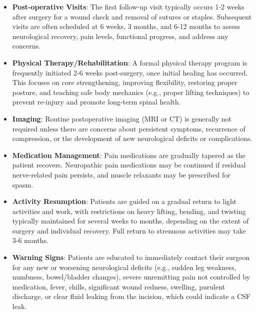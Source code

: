 \begin{itemize}
  \item \textbf{Post-operative Visits}: The first follow-up visit typically occurs 1-2 weeks after surgery for a wound check and removal of sutures or staples. Subsequent visits are often scheduled at 6 weeks, 3 months, and 6-12 months to assess neurological recovery, pain levels, functional progress, and address any concerns.
  \item \textbf{Physical Therapy/Rehabilitation}: A formal physical therapy program is frequently initiated 2-6 weeks post-surgery, once initial healing has occurred. This focuses on core strengthening, improving flexibility, restoring proper posture, and teaching safe body mechanics (e.g., proper lifting techniques) to prevent re-injury and promote long-term spinal health.
  \item \textbf{Imaging}: Routine postoperative imaging (MRI or CT) is generally not required unless there are concerns about persistent symptoms, recurrence of compression, or the development of new neurological deficits or complications.
  \item \textbf{Medication Management}: Pain medications are gradually tapered as the patient recovers. Neuropathic pain medications may be continued if residual nerve-related pain persists, and muscle relaxants may be prescribed for spasm.
  \item \textbf{Activity Resumption}: Patients are guided on a gradual return to light activities and work, with restrictions on heavy lifting, bending, and twisting typically maintained for several weeks to months, depending on the extent of surgery and individual recovery. Full return to strenuous activities may take 3-6 months.
  \item \textbf{Warning Signs}: Patients are educated to immediately contact their surgeon for any new or worsening neurological deficits (e.g., sudden leg weakness, numbness, bowel/bladder changes), severe unremitting pain not controlled by medication, fever, chills, significant wound redness, swelling, purulent discharge, or clear fluid leaking from the incision, which could indicate a CSF leak.
\end{itemize}

